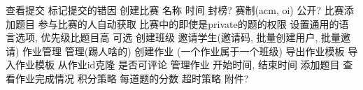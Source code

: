 {}\markdownRendererInterblockSeparator
{}\markdownRendererUlBeginTight
\markdownRendererUlItem 查看提交\markdownRendererUlItemEnd 
\markdownRendererUlItem 标记提交的错因\markdownRendererUlItemEnd 
\markdownRendererUlEndTight \markdownRendererInterblockSeparator
{}\markdownRendererInterblockSeparator
{}\markdownRendererUlBeginTight
\markdownRendererUlItem 创建比赛\markdownRendererUlItemEnd 
\markdownRendererUlItem 名称\markdownRendererUlItemEnd 
\markdownRendererUlItem 时间\markdownRendererUlItemEnd 
\markdownRendererUlItem 封榜?\markdownRendererUlItemEnd 
\markdownRendererUlItem 赛制(acm, oi)\markdownRendererUlItemEnd 
\markdownRendererUlItem {}\markdownRendererUlItemEnd 
\markdownRendererUlItem 公开?\markdownRendererUlItemEnd 
\markdownRendererUlItem 比赛添加题目\markdownRendererUlItemEnd 
\markdownRendererUlItem 参与比赛的人自动获取 比赛中的即使是private的题的权限\markdownRendererUlItemEnd 
\markdownRendererUlItem 设置通用的语言选项, 优先级比题目高  可选\markdownRendererUlItemEnd 
\markdownRendererUlEndTight \markdownRendererInterblockSeparator
{}\markdownRendererInterblockSeparator
{}\markdownRendererUlBeginTight
\markdownRendererUlItem 创建班级\markdownRendererUlItemEnd 
\markdownRendererUlItem 邀请学生(邀请码, 批量创建用户, 批量邀请)\markdownRendererUlItemEnd 
\markdownRendererUlItem 作业管理\markdownRendererUlItemEnd 
\markdownRendererUlItem 管理(踢人啥的)\markdownRendererUlItemEnd 
\markdownRendererUlEndTight \markdownRendererInterblockSeparator
{}\markdownRendererInterblockSeparator
{}\markdownRendererUlBeginTight
\markdownRendererUlItem 创建作业 (一个作业属于一个班级)\markdownRendererUlItemEnd 
\markdownRendererUlItem 导出作业模板\markdownRendererUlItemEnd 
\markdownRendererUlItem 导入作业模板\markdownRendererUlItemEnd 
\markdownRendererUlItem 从作业id克隆\markdownRendererUlItemEnd 
\markdownRendererUlItem 是否可评论\markdownRendererUlItemEnd 
\markdownRendererUlItem 管理作业\markdownRendererUlItemEnd 
\markdownRendererUlItem 开始时间, 结束时间\markdownRendererUlItemEnd 
\markdownRendererUlItem 添加题目\markdownRendererUlItemEnd 
\markdownRendererUlItem 查看作业完成情况\markdownRendererUlItemEnd 
\markdownRendererUlItem 积分策略\markdownRendererUlItemEnd 
\markdownRendererUlItem 每道题的分数\markdownRendererUlItemEnd 
\markdownRendererUlItem 超时策略\markdownRendererUlItemEnd 
\markdownRendererUlItem 附件?\markdownRendererUlItemEnd 
